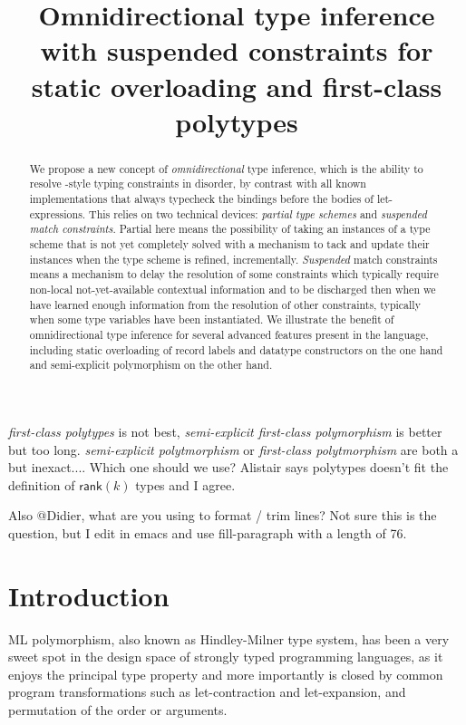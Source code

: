 \documentclass[acmsmall,screen,nonacm]{acmart}
\title{Omnidirectional type inference with suspended constraints
   for static overloading and first-class polytypes}
\begin{document}
\begin{abstract}
We propose a new concept of \emph{omnidirectional} type inference, which is
the ability to resolve \ML-style typing constraints in disorder, by
contrast with all known implementations that always typecheck the
bindings before the bodies of let-expressions.
%
This relies on two technical devices: \emph{partial type schemes}
and \emph{suspended match constraints}. Partial here means  the
possibility of taking an instances of a type scheme that is not yet
completely solved with a mechanism to tack and update their instances when
the type scheme is refined, incrementally.
\emph{Suspended} match constraints means a mechanism to delay the resolution of
some constraints which typically require non-local not-yet-available
contextual information and to be discharged then when we have learned enough
information from the resolution of other constraints, typically when some type
variables have been instantiated.
%
We illustrate the benefit of omnidirectional type inference for several
advanced features present in the \OCaml language, including static
overloading of record labels and datatype constructors on the one hand and
semi-explicit polymorphism on the other hand.
\end{abstract}

\maketitle

\Xdidier
  {\emph{first-class polytypes} is not best,
   \emph{semi-explicit first-class polymorphism} is better but too long.
   \emph{semi-explicit polytmorphism} or 
   \emph{first-class polytmorphism} are both a but inexact....
   Which one should we use?
   Alistair says polytypes doesn't fit the definition of $\mathsf{rank}(k)$
  types and I agree.} 

\Xalistair
  {Also @Didier, what are you using to format / trim lines?
   Not sure this is the question, but I edit in emacs and use
   fill-paragraph with a length of 76.}

\section{Introduction}

ML polymorphism, also known as Hindley-Milner type system, has been a very
sweet spot in the design space of strongly typed programming languages, as
it enjoys the principal type property and more importantly is closed by
common program transformations such as let-contraction and let-expansion,
and permutation of the order or arguments.
\end{document}
